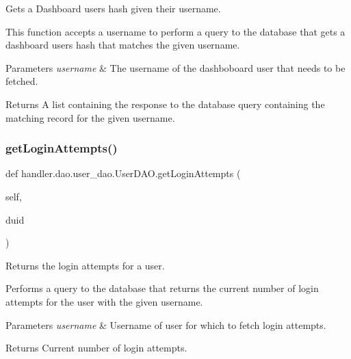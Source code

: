 Gets a Dashboard user\textquotesingle{}s hash given their username. 

This function accepts a username to perform a query to the database that gets a dashboard user\textquotesingle{}s hash that matches the given username.


\begin{DoxyParams}{Parameters}
{\em username} & The username of the dashboboard user that needs to be fetched.\\
\hline
\end{DoxyParams}
\begin{DoxyReturn}{Returns}
A list containing the response to the database query containing the matching record for the given username. 
\end{DoxyReturn}
\mbox{\label{classhandler_1_1dao_1_1user__dao_1_1_user_d_a_o_ac9b514fe18ddd0270ccba0bdbe053da4}} 
\subsubsection{\texorpdfstring{get\+Login\+Attempts()}{getLoginAttempts()}}
{\footnotesize\ttfamily def handler.\+dao.\+user\+\_\+dao.\+User\+D\+A\+O.\+get\+Login\+Attempts (\begin{DoxyParamCaption}\item[{}]{self,  }\item[{}]{duid }\end{DoxyParamCaption})}



Returns the login attempts for a user. 

Performs a query to the database that returns the current number of login attempts for the user with the given username.


\begin{DoxyParams}{Parameters}
{\em username} & Username of user for which to fetch login attempts.\\
\hline
\end{DoxyParams}
\begin{DoxyReturn}{Returns}
Current number of login attempts. 
\end{DoxyReturn}
\mbox{\label{classhandler_1_1dao_1_1user__dao_1_1_user_d_a_o_a7a17e7bf435c7b67263577d6da96bb47}} 

